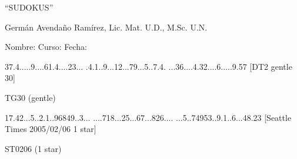 \documentclass{article}
\begin{document}
\begin{center}
\large ``SUDOKUS''
\end{center}
\begin{center}
Germ\'an Avenda\~no Ram\'irez, Lic. Mat. U.D., M.Sc. U.N.
\end{center}
Nombre: \hrulefill Curso: \underline{\hspace*{44pt}} Fecha: \underline{\hspace*{2.5cm}}
\cluefont{\Large}

\begin{center}
\renewcommand*{\puzzlefile}{tg30.sud}
\writepuzzle%
{37.4.....}{9....61.4}{....23...}%
{.4.1..9..}{.12...79.}{..5..7.4.}%
{...36....}{4.32....6}{.....9.57}%
[DT2 gentle 30]
\vfill
\begin{minipage}{0.95\linewidth}\begin{center}
TG30 (gentle) \\
\end{center}\end{minipage}
\end{center}

\begin{center}
\renewcommand*{\puzzlefile}{st0206.sud}
\writepuzzle%
{17.42...5}{..2.1..96}{849..3...}%
{....718..}{.25...67.}{..826....}%
{...5..749}{53..9.1..}{6...48.23}%
[Seattle Times 2005/02/06 1 star]
\vfill
\begin{minipage}{0.95\linewidth}\begin{center}
ST0206 (1 star) \\
\end{center}\end{minipage}
\end{center}
\end{document}
